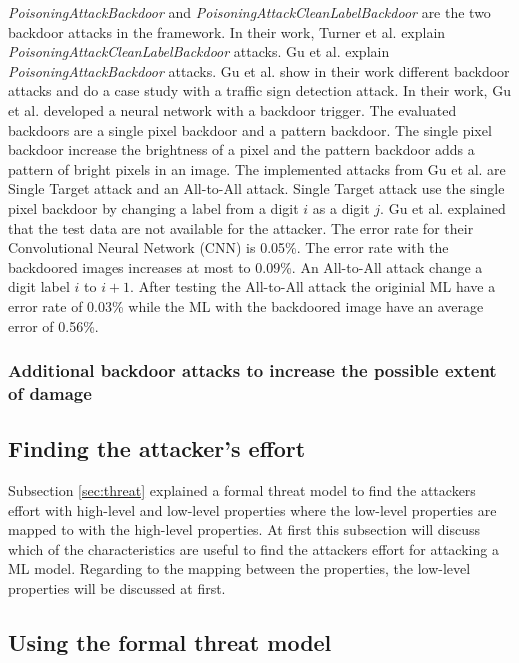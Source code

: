 \textit{PoisoningAttackBackdoor} and \textit{PoisoningAttackCleanLabelBackdoor} are the two backdoor attacks in the framework. In their work, Turner et al. \cite{turner2018clean} explain
\textit{PoisoningAttackCleanLabelBackdoor} attacks. Gu et al. \cite{DBLP:journals/corr/abs-1708-06733} explain \textit{PoisoningAttackBackdoor} attacks. Gu et al. \cite{DBLP:journals/corr/abs-1708-06733} show in their work different backdoor attacks and do a case study with a traffic sign detection attack. In their work, Gu et al. developed a neural network with a backdoor trigger. The evaluated backdoors are a single pixel backdoor and a pattern backdoor. The single pixel backdoor increase the brightness of a pixel and the pattern backdoor adds a pattern of bright pixels in an image. The implemented attacks from Gu et al. are Single Target attack and an All-to-All attack. Single Target attack use the single pixel backdoor by changing a label from a digit $i$ as a digit $j$. Gu et al. explained that the test data are not available for the attacker. The error rate for their Convolutional Neural Network (CNN) is 0.05\%. The error rate with the backdoored images increases at most to 0.09\%. An All-to-All attack change a digit label $i$ to $i + 1$. After testing the All-to-All attack the originial ML have a error rate of 0.03\% while the ML with the backdoored image have an average error of 0.56\%.

\subsubsection*{Additional backdoor attacks to increase the possible extent of damage}


\subsection{Finding the attacker's effort}

Subsection \ref{sec:threat} explained a formal threat model to find the attackers effort with high-level and low-level properties where the low-level properties are mapped to with the high-level properties. At first this subsection will discuss which of the characteristics are useful to find the attackers effort for attacking a ML model. Regarding to the mapping between the properties, the low-level properties will be discussed at first.

\subsection{Using the formal threat model}


